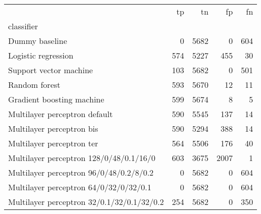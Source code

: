 \begin{tabular}{lrrrr}
\toprule
 & tp & tn & fp & fn \\
classifier &  &  &  &  \\
\midrule
Dummy baseline & 0 & 5682 & 0 & 604 \\
Logistic regression & 574 & 5227 & 455 & 30 \\
Support vector machine & 103 & 5682 & 0 & 501 \\
Random forest & 593 & 5670 & 12 & 11 \\
Gradient boosting machine & 599 & 5674 & 8 & 5 \\
Multilayer perceptron default & 590 & 5545 & 137 & 14 \\
Multilayer perceptron bis & 590 & 5294 & 388 & 14 \\
Multilayer perceptron ter & 564 & 5506 & 176 & 40 \\
Multilayer perceptron 128/0/48/0.1/16/0 & 603 & 3675 & 2007 & 1 \\
Multilayer perceptron 96/0/48/0.2/8/0.2 & 0 & 5682 & 0 & 604 \\
Multilayer perceptron 64/0/32/0/32/0.1 & 0 & 5682 & 0 & 604 \\
Multilayer perceptron 32/0.1/32/0.1/32/0.2 & 254 & 5682 & 0 & 350 \\
\bottomrule
\end{tabular}
